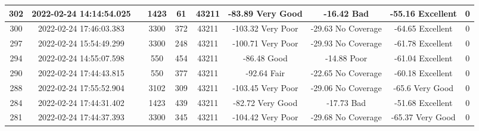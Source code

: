\begin{longtable*}{|c|c|c|c|c|c|c|c|c|c|}
302&2022-02-24 14:14:54.025&&1423&61&43211& -83.89    Very Good   & -16.42    Bad         & -55.16    Excellent   & 0\\\hline
{}300&2022-02-24 17:46:03.383&&3300&372&43211& -103.32   Very Poor   & -29.63    No Coverage & -64.65    Excellent   & 0\\\hline
{}297&2022-02-24 15:54:49.299&&3300&248&43211& -100.71   Very Poor   & -29.93    No Coverage & -61.78    Excellent   & 0\\\hline
{}294&2022-02-24 14:55:07.598&&550&454&43211& -86.48    Good        & -14.88    Poor        & -61.04    Excellent   & 0\\\hline
{}290&2022-02-24 17:44:43.815&&550&377&43211& -92.64    Fair        & -22.65    No Coverage & -60.18    Excellent   & 0\\\hline
{}288&2022-02-24 17:55:52.904&&3102&309&43211& -103.45   Very Poor   & -29.06    No Coverage & -65.6     Very Good   & 0\\\hline
{}284&2022-02-24 17:44:31.402&&1423&439&43211& -82.72    Very Good   & -17.73    Bad         & -51.68    Excellent   & 0\\\hline
{}281&2022-02-24 17:44:37.393&&3300&345&43211& -104.42   Very Poor   & -29.68    No Coverage & -65.37    Very Good   & 0\\\hline

\end{longtable*}
